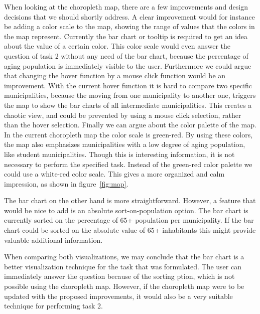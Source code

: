 When looking at the choropleth map, there are a few improvements and design decisions that we should shortly address. A clear improvement would for instance be adding a color scale to the map, showing the range of values that the colors in the map represent. Currently the bar chart or tooltip is required to get an idea about the value of a certain color. This color scale would even answer the question of task 2 without any need of the bar chart, because the percentage of aging population is immediately visible to the user. Furthermore we could argue that changing the hover function by a mouse click function would be an improvement. With the current hover function it is hard to compare two specific municipalities, because the moving from one municipality to another one, triggers the map to show the bar charts of all intermediate municipalities. This creates a chaotic view, and could be prevented by using a mouse click selection, rather than the hover selection. Finally we can argue about the color palette of the map. In the current choropleth map the color scale is green-red. By using these colors, the map also emphasizes municipalities with a low degree of aging population, like student municipalities. Though this is interesting information, it is not necessary to perform the specified task. Instead of the green-red color palette we could use a white-red color scale. This gives a more organized and calm impression, as shown in figure~\ref{fig:map}.

The bar chart on the other hand is more straightforward. However, a feature that would be nice to add is an absolute sort-on-population option. The bar chart is currently sorted on the percentage of 65+ population per municipality. If the bar chart could be sorted on the absolute value of 65+ inhabitants this might provide valuable additional information.

When comparing both visualizations, we may conclude that the bar chart is a better visualization technique for the task that was formulated. The user can immediately answer the question because of the sorting ption, which is not possible using the choropleth map. However, if the choropleth map were to be updated with the proposed improvements, it would also be a very suitable technique for performing task 2.

